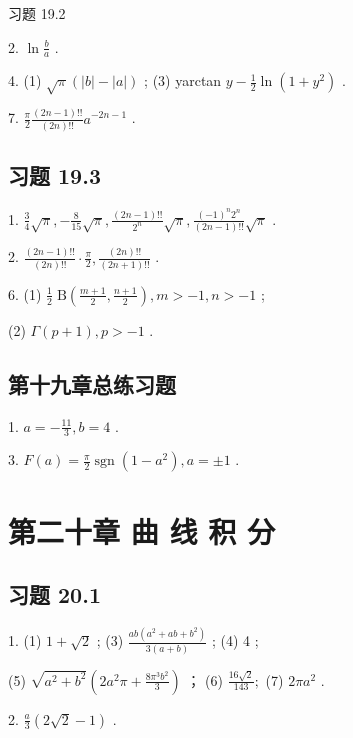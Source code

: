 习题 19.2

2. \(\ln \frac{b}{a}\) .

4. (1) \(\sqrt{\pi }\left( {\left| b\right|  - \left| a\right| }\right)\) ; (3) yarctan \(y - \frac{1}{2}\ln \left( {1 + {y}^{2}}\right)\) .

7. \(\frac{\pi }{2}\frac{\left( {{2n} - 1}\right) !!}{\left( {2n}\right) !!}{a}^{-{2n} - 1}\) .

\subsection{习题 19.3}

1. \(\frac{3}{4}\sqrt{\pi }, - \frac{8}{15}\sqrt{\pi },\frac{\left( {{2n} - 1}\right) !!}{{2}^{n}}\sqrt{\pi },\frac{{\left( -1\right) }^{n}{2}^{n}}{\left( {{2n} - 1}\right) !!}\sqrt{\pi }\) .

2. \(\frac{\left( {{2n} - 1}\right) !!}{\left( {2n}\right) !!} \cdot  \frac{\pi }{2},\frac{\left( {2n}\right) !!}{\left( {{2n} + 1}\right) !!}\) .

6. (1) \(\frac{1}{2}\mathrm{\;B}\left( {\frac{m + 1}{2},\frac{n + 1}{2}}\right) ,m >  - 1,n >  - 1\) ;

(2) \(\Gamma \left( {p + 1}\right) ,p >  - 1\) .

\subsection{第十九章总练习题}

1. \(a =  - \frac{11}{3},b = 4\) .

3. \(F\left( a\right)  = \frac{\pi }{2}\operatorname{sgn}\left( {1 - {a}^{2}}\right) ,a =  \pm  1\) .

\section{第二十章 曲 线 积 分}

\subsection{习题 20.1}

1. (1) \(1 + \sqrt{2}\) ; (3) \(\frac{{ab}\left( {{a}^{2} + {ab} + {b}^{2}}\right) }{3\left( {a + b}\right) }\) ; (4) 4 ;

(5) \(\sqrt{{a}^{2} + {b}^{2}}\left( {2{a}^{2}\pi  + \frac{8{\pi }^{3}{b}^{2}}{3}}\right)\) ； (6) \(\frac{{16}\sqrt{2}}{143};\) (7) \({2\pi }{a}^{2}\) .

2. \(\frac{a}{3}\left( {2\sqrt{2} - 1}\right)\) .

